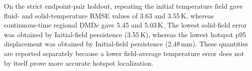 On the strict endpoint-pair holdout, repeating the initial temperature field gave fluid- and solid-temperature RMSE values of 3.63 and 3.55\,K, whereas continuous-time regional DMDc gave 5.45 and 5.03\,K. The lowest solid-field error was obtained by Initial-field persistence (3.55\,K), whereas the lowest hotspot p95 displacement was obtained by Initial-field persistence (2.48\,mm). These quantities are reported separately because a lower field-average temperature error does not by itself prove more accurate hotspot localization.

